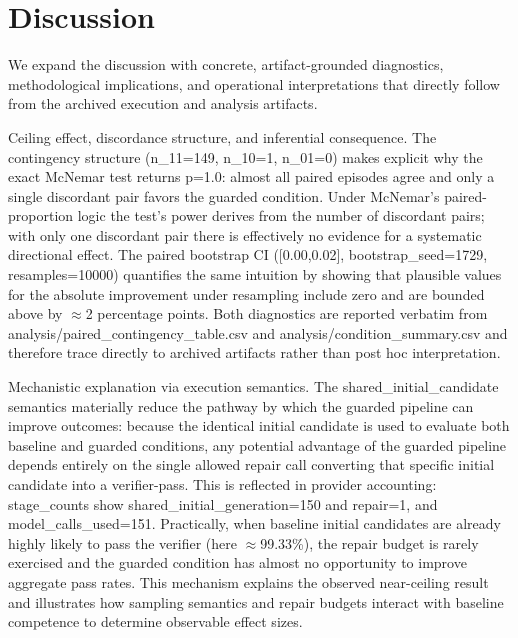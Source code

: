 \documentclass[conference]{IEEEtran}
\begin{document}
\section{Discussion}
We expand the discussion with concrete, artifact-grounded diagnostics, methodological implications, and operational interpretations that directly follow from the archived execution and analysis artifacts.

Ceiling effect, discordance structure, and inferential consequence. The contingency structure (n\_11=149, n\_10=1, n\_01=0) makes explicit why the exact McNemar test returns p=1.0: almost all paired episodes agree and only a single discordant pair favors the guarded condition. Under McNemar's paired-proportion logic the test's power derives from the number of discordant pairs; with only one discordant pair there is effectively no evidence for a systematic directional effect. The paired bootstrap CI ([0.00,0.02], bootstrap\_seed=1729, resamples=10000) quantifies the same intuition by showing that plausible values for the absolute improvement under resampling include zero and are bounded above by \ensuremath{\approx}2 percentage points. Both diagnostics are reported verbatim from analysis/paired\_contingency\_table.csv and analysis/condition\_summary.csv and therefore trace directly to archived artifacts rather than post hoc interpretation.

Mechanistic explanation via execution semantics. The shared\_initial\_candidate semantics materially reduce the pathway by which the guarded pipeline can improve outcomes: because the identical initial candidate is used to evaluate both baseline and guarded conditions, any potential advantage of the guarded pipeline depends entirely on the single allowed repair call converting that specific initial candidate into a verifier-pass. This is reflected in provider accounting: stage\_counts show shared\_initial\_generation=150 and repair=1, and model\_calls\_used=151. Practically, when baseline initial candidates are already highly likely to pass the verifier (here \ensuremath{\approx}99.33\%), the repair budget is rarely exercised and the guarded condition has almost no opportunity to improve aggregate pass rates. This mechanism explains the observed near-ceiling result and illustrates how sampling semantics and repair budgets interact with baseline competence to determine observable effect sizes.
\end{document}
